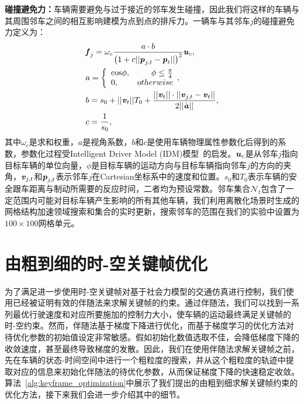 \textbf{碰撞避免力：}车辆需要避免与过于接近的邻车发生碰撞，因此我们将这样的车辆与其周围邻车之间的相互影响建模为点到点的排斥力。一辆车与其邻车$j$的碰撞避免力定义为：
\begin{equation}
\setlength\abovedisplayskip{6pt}
\setlength\belowdisplayskip{6pt}
\label{eq:keyframe_collisionavoid}
\begin{aligned}
    & {\textbf{\emph{f}}}_{j} = \omega_c \frac{a  \cdot b }{\left(1+c||\textbf{\emph{p}}_{j,t} - \textbf{\emph{p}}_t||  \right)^2}\textbf{\emph{u}}_c, \\
    & a = \left\{
        \begin{array}{lr}
        \rm{cos} \phi, & \phi \leq \frac{\pi}{4} \\
        0, & otherwise
        \end{array}, 
    \right. \\
    & b = s_0 + ||\textbf{\emph{v}}_t || T_0 + \frac{||\textbf{\emph{v}}_t||\cdot || \textbf{\emph{v}}_{j,t} - \textbf{\emph{v}}_t ||}{2||\hat{\textbf{\emph{a}}}||}, \\
    & c = \frac{1}{s_0},
\end{aligned}
\end{equation}
其中$\omega_c$是求和权重，$a$是视角系数，$b$和$c$是使用车辆物理属性参数化后得到的系数，参数化过程受Intelligent Driver Model (IDM)模型~\cite{treiber2000congested-idm}的启发。$\textbf{\emph{u}}_c$是从邻车$j$指向目标车辆的单位向量，$\phi$是目标车辆的运动方向与目标车辆指向邻车$j$的方向的夹角，$\textbf{\emph{v}}_{j,t}$和$\textbf{\emph{p}}_{j,t}$表示邻车$j$在Cartesian坐标系中的速度和位置。$s_0$和$T_0$表示车辆的安全跟车距离与制动所需要的反应时间，二者均为预设常数。邻车集合$\mathcal{N}_t$包含了一定范围内可能对目标车辆产生影响的所有其他车辆，我们利用离散化场景时生成的网格结构加速领域搜索和集合的实时更新，搜索邻车的范围在我们的实验中设置为$100\times100$网格单元。


\section{由粗到细的时-空关键帧优化}

为了满足进一步使用时-空关键帧对基于社会力模型的交通仿真进行控制，我们使用已经被证明有效的伴随法来求解关键帧的约束。通过伴随法，我们可以找到一系列最优行驶速度和对应所要施加的控制力大小，使车辆的运动最终满足关键帧的时-空约束。然而，伴随法基于梯度下降进行优化，而基于梯度学习的优化方法对待优化参数的初始值设定非常敏感。假如初始化数值选取不佳，会降低梯度下降的收敛速度，甚至最终导致梯度的发散。因此，我们在使用伴随法求解关键帧之前，先在车辆的状态-时间空间中进行一个粗粒度的搜索，并从这个粗粒度的轨迹中提取对应的信息来初始化伴随法的待优化参数，从而保证梯度下降的快速稳定收敛。算法~\ref{alg:keyframe_optimization}中展示了我们提出的由粗到细求解关键帧约束的优化方法，接下来我们会进一步介绍其中的细节。

